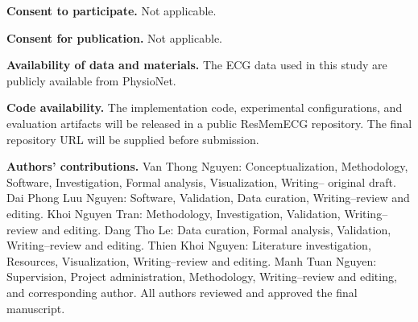 \documentclass[pdflatex,sn-mathphys-num]{sn-jnl}
\begin{document}
\textbf{Consent to participate.} Not applicable.

\textbf{Consent for publication.} Not applicable.

\textbf{Availability of data and materials.} The ECG data used in this study are publicly available from PhysioNet.

\textbf{Code availability.} The implementation code, experimental configurations,
and evaluation artifacts will be released in a public ResMemECG repository. The
final repository URL will be supplied before submission.

\textbf{Authors' contributions.} Van Thong Nguyen: Conceptualization,
Methodology, Software, Investigation, Formal analysis, Visualization, Writing--
original draft. Dai Phong Luu Nguyen: Software, Validation, Data curation,
Writing--review and editing. Khoi Nguyen Tran: Methodology, Investigation,
Validation, Writing--review and editing. Dang Tho Le: Data curation, Formal
analysis, Validation, Writing--review and editing. Thien Khoi Nguyen: Literature
investigation, Resources, Visualization, Writing--review and editing. Manh Tuan
Nguyen: Supervision, Project administration, Methodology, Writing--review and
editing, and corresponding author. All authors reviewed and approved the final
manuscript.

\setlength{\bibsep}{0pt}

\end{document}
